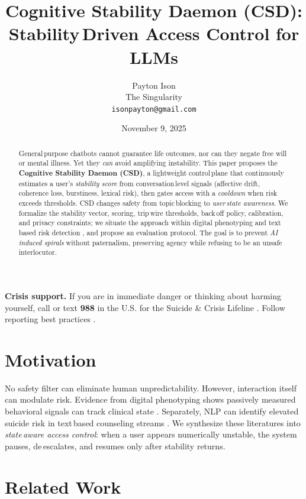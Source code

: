 \documentclass[11pt]{article}
\title{Cognitive Stability Daemon (CSD):\\ Stability\,Driven Access Control for LLMs}
\author{Payton Ison\\The Singularity\\\texttt{isonpayton@gmail.com}}
\date{November 9, 2025}
\begin{document}
\maketitle

\begin{abstract}
General\,purpose chatbots cannot guarantee life outcomes, nor can they negate free will or mental illness. Yet they \emph{can} avoid amplifying instability. This paper proposes the \textbf{Cognitive Stability Daemon (CSD)}, a lightweight control\,plane that continuously estimates a user's \emph{stability score} from conversation\,level signals (affective drift, coherence loss, burstiness, lexical risk), then gates access with a \emph{cooldown} when risk exceeds thresholds. CSD changes safety from topic\,blocking to \emph{user\,state awareness}. We formalize the stability vector, scoring, trip\,wire thresholds, back\,off policy, calibration, and privacy constraints; we situate the approach within digital phenotyping \parencite{Huckvale2019} and text\,based risk detection \parencite{Broadbent2023,Thomas2025}, and propose an evaluation protocol. The goal is to prevent \emph{AI\,induced spirals} without paternalism, preserving agency while refusing to be an unsafe interlocutor.
\end{abstract}

\vspace{0.5em}
\noindent\textbf{Crisis support.} If you are in immediate danger or thinking about harming yourself, call or text \textbf{988} in the U.S. for the Suicide \& Crisis Lifeline \parencite{Lifeline988}. Follow reporting best practices \parencite{WHO2023}.

\section{Motivation}
No safety filter can eliminate human unpredictability. However, interaction itself can modulate risk. Evidence from digital phenotyping shows passively measured behavioral signals can track clinical state \parencite{Huckvale2019}. Separately, NLP can identify elevated suicide risk in text\,based counseling streams \parencite{Broadbent2023,Thomas2025}. We synthesize these literatures into \emph{state\,aware access control}: when a user appears numerically unstable, the system pauses, de\,escalates, and resumes only after stability returns.

\section{Related Work}
\end{document}
